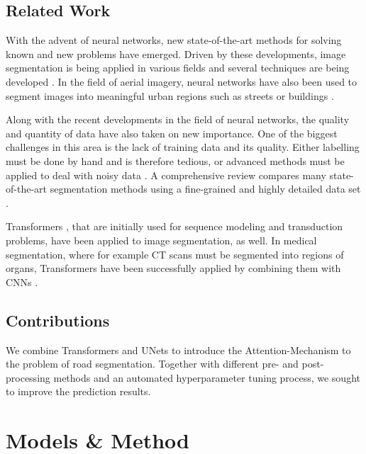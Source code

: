 \documentclass[10pt,conference,compsocconf]{IEEEtran}
\begin{document}
\subsection{Related Work}


With the advent of neural networks, new state-of-the-art methods for solving known and new problems have emerged. Driven by these developments, image segmentation is being applied in various fields and several techniques are being developed \cite{PAL19931277}. In the field of aerial imagery, neural networks have also been used to segment images into meaningful urban regions such as streets or buildings \cite{DBLP:journals/corr/abs-2007-06102} \cite{Marmanis2016} \cite{GUPTA202122}.


Along with the recent developments in the field of neural networks, the quality and quantity of data have also taken on new importance. One of the biggest challenges in this area is the lack of training data and its quality. Either labelling must be done by hand and is therefore tedious, or advanced methods must be applied to deal with noisy data \cite{10.5555/3042573.3042603}. A comprehensive review compares many state-of-the-art segmentation methods using a fine-grained and highly detailed data set \cite{DBLP:journals/corr/abs-2007-06102}.


Transformers \cite{Vaswani2017}, that are initially used for sequence modeling and transduction problems, have been applied to image segmentation, as well. In medical segmentation, where for example CT scans must be segmented into regions of organs, Transformers have been successfully applied by combining them with CNNs \cite{Petit2021} \cite{Chen2021}.

\subsection{Contributions}

We combine Transformers and UNets to introduce the Attention-Mechanism to the problem of road segmentation. Together with different pre- and post-processing methods and an automated hyperparameter tuning process, we sought to improve the prediction results.

\section{Models \& Method}
\end{document}
